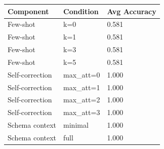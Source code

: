 \begin{tabular}{lll}
\toprule
Component & Condition & Avg Accuracy \\
\midrule
Few-shot & k=0 & 0.581 \\
Few-shot & k=1 & 0.581 \\
Few-shot & k=3 & 0.581 \\
Few-shot & k=5 & 0.581 \\
Self-correction & max_att=0 & 1.000 \\
Self-correction & max_att=1 & 1.000 \\
Self-correction & max_att=2 & 1.000 \\
Self-correction & max_att=3 & 1.000 \\
Schema context & minimal & 1.000 \\
Schema context & full & 1.000 \\
\bottomrule
\end{tabular}
